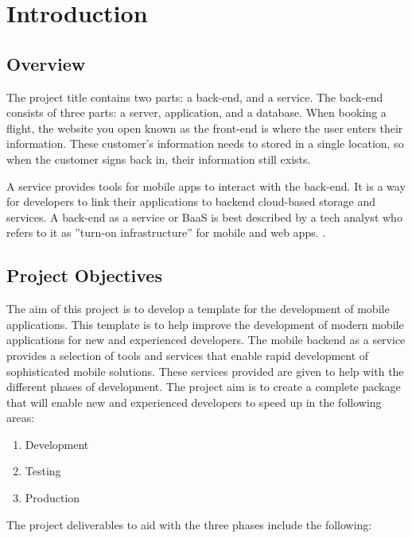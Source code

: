 \chapter{Introduction}

\section{Overview}

The project title contains two parts: a back-end, and a service. The back-end consists of three parts: a server, application, and a database. When booking a flight, the website you open known as the front-end is where the user enters their information. These customer’s information needs to stored in a single location, so when the customer signs back in, their information still exists.

A service provides tools for mobile apps to interact with the back-end. It is a way for developers to link their applications to backend cloud-based storage and services. A back-end as a service or BaaS is best described by a tech analyst who refers to it as ”turn-on infrastructure” for mobile and web apps. \cite{kinveywebsite}.

\section{Project Objectives}
The aim of this project is to develop a template for the development of mobile applications. This template is to help improve the development of modern mobile applications for new and experienced developers. The mobile backend as a service provides a selection of tools and services that enable rapid development of sophisticated mobile solutions. These services provided are given to help with the different phases of development. The project aim is to create a complete package that will enable new and experienced developers to speed up in the following areas:

\begin{enumerate}
  \item Development
  \item Testing 
  \item Production
\end{enumerate}

The project deliverables to aid with the three phases include the following:

